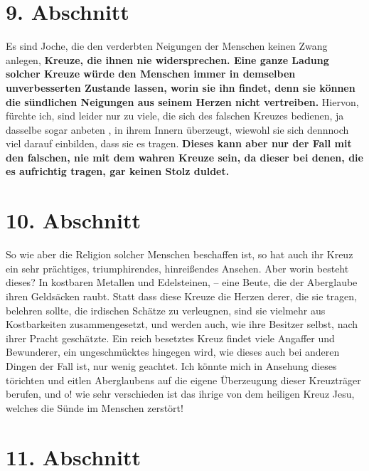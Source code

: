 \section{9. Abschnitt} \label{kap5_ab9}

\label{ref:05_09_kreuz}
Es sind Joche, die den verderbten Neigungen der Menschen keinen Zwang anlegen,
\textbf{Kreuze, die ihnen nie widersprechen. Eine ganze Ladung solcher Kreuze
würde den
Menschen immer in demselben unverbesserten Zustande lassen, worin sie ihn
findet, denn sie können die sündlichen Neigungen aus seinem Herzen nicht
vertreiben.} Hiervon, fürchte ich, sind leider nur zu viele, die sich des
falschen Kreuzes  bedienen, ja dasselbe sogar anbeten
, in ihrem Innern überzeugt,
wiewohl sie sich dennnoch viel darauf einbilden, dass sie es tragen.
\textbf{Dieses kann
aber nur der Fall mit den falschen, nie mit dem wahren Kreuze sein, da dieser
bei denen, die es aufrichtig tragen, gar keinen Stolz duldet.}

\section{10. Abschnitt} \label{kap5_ab10}

So wie aber die Religion solcher Menschen beschaffen ist, so hat auch ihr Kreuz
ein sehr prächtiges, triumphirendes, hinreißendes Ansehen. Aber worin besteht
dieses? In kostbaren Metallen und Edelsteinen, -- eine Beute, die der Aberglaube
ihren Geldsäcken raubt. Statt dass diese Kreuze die Herzen derer, die sie tragen,
belehren sollte, die irdischen Schätze zu verleugnen, sind sie vielmehr aus
Kostbarkeiten zusammengesetzt, und werden auch, wie ihre Besitzer selbst, nach
ihrer Pracht geschätzte. Ein reich besetztes Kreuz findet viele Angaffer und
Bewunderer, ein ungeschmücktes hingegen wird, wie dieses auch bei anderen Dingen
der Fall ist, nur wenig geachtet. Ich könnte mich in Ansehung dieses törichten
und eitlen Aberglaubens  auf die eigene Überzeugung dieser Kreuzträger berufen,
und o! wie sehr verschieden ist das ihrige von dem heiligen Kreuz Jesu,
welches die Sünde im Menschen zerstört!

\section{11. Abschnitt} \label{kap5_ab11}

